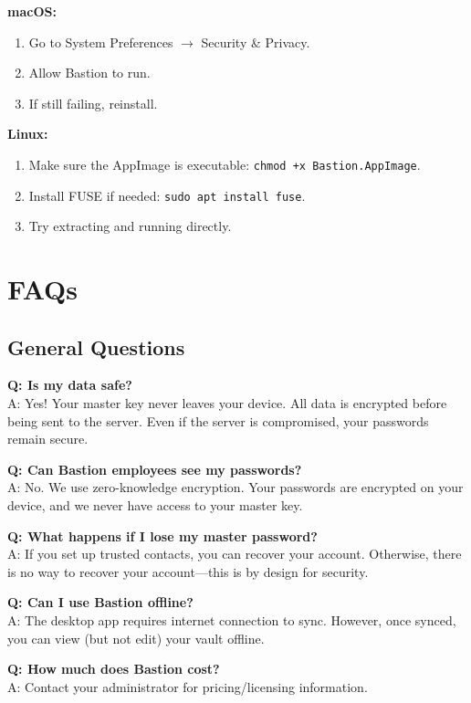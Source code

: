 \documentclass[11pt,a4paper]{article}
\begin{document}
\textbf{macOS:}
\begin{enumerate}
    \item Go to System Preferences $\rightarrow$ Security \& Privacy.
    \item Allow Bastion to run.
    \item If still failing, reinstall.
\end{enumerate}

\textbf{Linux:}
\begin{enumerate}
    \item Make sure the AppImage is executable: \texttt{chmod +x Bastion.AppImage}.
    \item Install FUSE if needed: \texttt{sudo apt install fuse}.
    \item Try extracting and running directly.
\end{enumerate}

\section{FAQs}

\subsection{General Questions}
\textbf{Q: Is my data safe?} \\
A: Yes! Your master key never leaves your device. All data is encrypted before being sent to the server. Even if the server is compromised, your passwords remain secure.

\textbf{Q: Can Bastion employees see my passwords?} \\
A: No. We use zero-knowledge encryption. Your passwords are encrypted on your device, and we never have access to your master key.

\textbf{Q: What happens if I lose my master password?} \\
A: If you set up trusted contacts, you can recover your account. Otherwise, there is no way to recover your account—this is by design for security.

\textbf{Q: Can I use Bastion offline?} \\
A: The desktop app requires internet connection to sync. However, once synced, you can view (but not edit) your vault offline.

\textbf{Q: How much does Bastion cost?} \\
A: Contact your administrator for pricing/licensing information.
\end{document}
